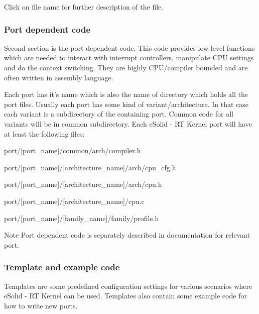 Click on file name for further description of the file.\hypertarget{files_org_files_dcode}{}\subsubsection{Port dependent code}\label{files_org_files_dcode}
Second section is the port dependent code. This code provides low-\/level functions which are needed to interact with interrupt controllers, manipulate C\-P\-U settings and do the context switching. They are highly C\-P\-U/compiler bounded and are often written in assembly language.

Each port has it's name which is also the name of directory which holds all the port files. Usually each port has some kind of variant/architecture. In that case each variant is a subdirectory of the containing port. Common code for all variants will be in common subdirectory. Each e\-Solid -\/ R\-T Kernel port will have at least the following files\-:
\begin{DoxyItemize}
\item {\ttfamily port/\mbox{[}port\-\_\-name\mbox{]}/common/arch/compiler.h}
\item {\ttfamily port/\mbox{[}port\-\_\-name\mbox{]}/\mbox{[}architecture\-\_\-name\mbox{]}/arch/cpu\-\_\-cfg.h}
\item {\ttfamily port/\mbox{[}port\-\_\-name\mbox{]}/\mbox{[}architecture\-\_\-name\mbox{]}/arch/cpu.h}
\item {\ttfamily port/\mbox{[}port\-\_\-name\mbox{]}/\mbox{[}architecture\-\_\-name\mbox{]}/cpu.c}
\item {\ttfamily port/\mbox{[}port\-\_\-name\mbox{]}/\mbox{[}family\-\_\-name\mbox{]}/family/profile.h}
\end{DoxyItemize}

\begin{DoxyNote}{Note}
Port dependent code is separately described in documentation for relevant port. 
\end{DoxyNote}
\hypertarget{files_org_files_template}{}\subsubsection{Template and example code}\label{files_org_files_template}
Templates are some predefined configuration settings for various scenarios where e\-Solid -\/ R\-T Kernel can be used. Templates also contain some example code for how to write new ports.

